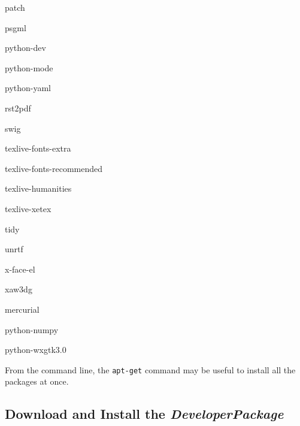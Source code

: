 \documentclass[12pt]{article}
\begin{document}
\begin{description}
\item patch
\item psgml
\item python-dev
\item python-mode
\item python-yaml
\item rst2pdf
\item swig


\item texlive-fonts-extra
\item texlive-fonts-recommended
\item texlive-humanities
\item texlive-xetex
\item tidy
\item unrtf
\item x-face-el
\item xaw3dg



\item mercurial
\item python-numpy
\item python-wxgtk3.0

% 
% 
%
% 
% 

\end{description}

From the command line, the {\tt apt-get} command may be useful to
install all the packages at once.


\subsection*{Download and Install the {\emph{DeveloperPackage}}}
\end{document}
